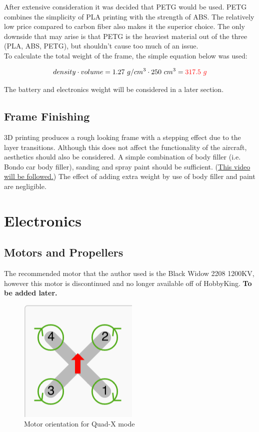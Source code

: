 \documentclass[12pt]{article}
\begin{document}
After extensive consideration it was decided that PETG would be used. PETG combines the simplicity of PLA printing with the strength of ABS. The relatively low price compared to carbon fiber also makes it the superior choice. The only downside that may arise is that PETG is the heaviest material out of the three (PLA, ABS, PETG), but shouldn't cause too much of an issue. 
\\

To calculate the total weight of the frame, the simple equation below was used:

\begin{equation}
density \cdot volume = 1.27\ g/cm\textsuperscript{3} \cdot 250\ cm\textsuperscript{3} = {\color{red}317.5\ g}
\end{equation}

The battery and electronics weight will be considered in a later section.

\subsection{Frame Finishing}
3D printing produces a rough looking frame with a stepping effect due to the layer transitions. Although this does not affect the functionality of the aircraft, aesthetics should also be considered. A simple combination of body filler (i.e. Bondo car body filler), sanding and spray paint should be sufficient. (\href{https://www.youtube.com/watch?v=NR2RF40Oq6M}{\color{cyan}This video will be followed.}) The effect of adding extra weight by use of body filler and paint are negligible.

\section{Electronics}

\subsection{Motors and Propellers}
The recommended motor that the author used is the Black Widow 2208 1200KV, however this motor is discontinued and no longer available off of HobbyKing. \textbf{To be added later.}

\begin{figure}[h]
\caption{Motor orientation for Quad-X mode}
\centering
\includegraphics[scale=0.5]{quadx.png}
\end{figure}
\end{document}
